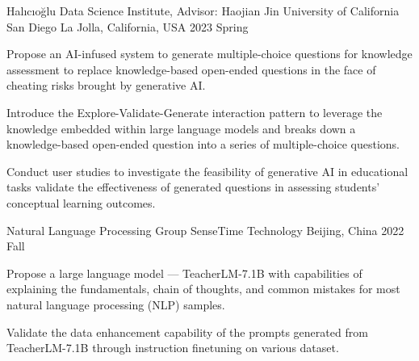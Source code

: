 

\begin{cventries}


  \cventry
    {Halıcıoğlu Data Science Institute, Advisor: Haojian Jin} %
    {University of California San Diego} %
    {La Jolla, California, USA} %
    {2023 Spring} %
    {
      \begin{cvitems}
        \item {Propose an AI-infused system to generate multiple-choice questions for knowledge assessment to replace knowledge-based open-ended questions in the face of cheating risks brought by generative AI.}
        \item {Introduce the Explore-Validate-Generate interaction pattern to leverage the knowledge embedded within large language models and breaks down a knowledge-based open-ended question into a series of multiple-choice questions.}
        \item {Conduct user studies to investigate the feasibility of generative AI in educational tasks validate the effectiveness of generated questions in assessing students' conceptual learning outcomes.}
      \end{cvitems}
    }
  
  \cventry
    {Natural Language Processing Group}
    {SenseTime Technology} 
    {Beijing, China} %
    {2022 Fall} %
    {
      \begin{cvitems} %
        \item Propose a large language model --- TeacherLM-7.1B with capabilities of explaining the fundamentals, chain of thoughts, and common mistakes for most natural language processing (NLP) samples.
        \item Validate the data enhancement capability of the prompts generated from TeacherLM-7.1B through instruction finetuning on various dataset.
      \end{cvitems}
    }


\end{cventries}
